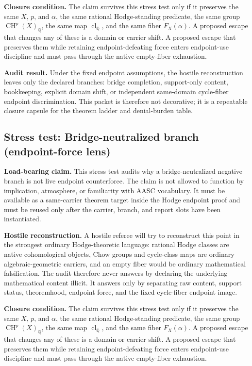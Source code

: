 \documentclass[11pt]{article}
\newcommand{\QQ}{\mathbb{Q}}
\newcommand{\CH}{\operatorname{CH}}
\newcommand{\clQ}{\operatorname{cl}_{\QQ}}
\begin{document}
\par\noindent\textbf{Closure condition.} The claim survives this stress test only if it preserves the same $X$, $p$, and $\alpha$, the same rational Hodge-standing predicate, the same group $\CH^p(X)_\QQ$, the same map $\clQ$, and the same fiber $F_X(\alpha)$. A proposed escape that changes any of these is a domain or carrier shift. A proposed escape that preserves them while retaining endpoint-defeating force enters endpoint-use discipline and must pass through the native empty-fiber exhaustion.

\par\noindent\textbf{Audit result.} Under the fixed endpoint assumptions, the hostile reconstruction leaves only the declared branches: bridge completion, support-only content, bookkeeping, explicit domain shift, or independent same-domain cycle-fiber endpoint discrimination. This packet is therefore not decorative; it is a repeatable closure capsule for the theorem ladder and denial-burden table.


\subsection{Stress test: Bridge-neutralized branch (endpoint-force lens)}

\par\noindent\textbf{Load-bearing claim.} This stress test audits why a bridge-neutralized negative branch is not live endpoint counterforce. The claim is not allowed to function by implication, atmosphere, or familiarity with AASC vocabulary. It must be available as a same-carrier theorem target inside the Hodge endpoint proof and must be reused only after the carrier, branch, and report slots have been instantiated.

\par\noindent\textbf{Hostile reconstruction.} A hostile referee will try to reconstruct this point in the strongest ordinary Hodge-theoretic language: rational Hodge classes are native cohomological objects, Chow groups and cycle-class maps are ordinary algebraic-geometric carriers, and an empty fiber would be ordinary mathematical falsification. The audit therefore never answers by declaring the underlying mathematical content illicit. It answers only by separating raw content, support status, theoremhood, endpoint force, and the fixed cycle-fiber endpoint image.

\par\noindent\textbf{Closure condition.} The claim survives this stress test only if it preserves the same $X$, $p$, and $\alpha$, the same rational Hodge-standing predicate, the same group $\CH^p(X)_\QQ$, the same map $\clQ$, and the same fiber $F_X(\alpha)$. A proposed escape that changes any of these is a domain or carrier shift. A proposed escape that preserves them while retaining endpoint-defeating force enters endpoint-use discipline and must pass through the native empty-fiber exhaustion.
\end{document}
